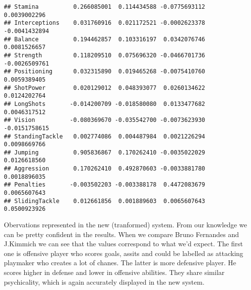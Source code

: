 \documentclass[
]{article}
\newenvironment{Shaded}{\begin{snugshade}}{\end{snugshade}}
\newcommand{\FunctionTok}[1]{\textcolor[rgb]{0.00,0.00,0.00}{#1}}
\newcommand{\NormalTok}[1]{#1}
\newcommand{\OtherTok}[1]{\textcolor[rgb]{0.56,0.35,0.01}{#1}}
\newcommand{\SpecialCharTok}[1]{\textcolor[rgb]{0.00,0.00,0.00}{#1}}
\newcommand{\StringTok}[1]{\textcolor[rgb]{0.31,0.60,0.02}{#1}}
\begin{document}
\begin{verbatim}
## Stamina          0.266085001  0.114434588 -0.0775693112  0.0039002296
## Interceptions    0.031760916  0.021172521 -0.0002623378 -0.0041432894
## Balance          0.194462857  0.103316197  0.0342076746  0.0081526657
## Strength         0.118209510  0.075696320 -0.0466701736 -0.0026509761
## Positioning      0.032315890  0.019465268 -0.0075410760  0.0059389405
## ShotPower        0.020129012  0.048393077  0.0260134622  0.0124202764
## LongShots       -0.014200709 -0.018580080  0.0133477682  0.0046317512
## Vision          -0.080369670 -0.035542700 -0.0073623930 -0.0151758615
## StandingTackle   0.002774086  0.004487984  0.0021226294  0.0098669766
## Jumping          0.905836867  0.170262410 -0.0035022029  0.0126618560
## Aggression       0.170262410  0.492870603 -0.0033881780  0.0018896035
## Penalties       -0.003502203 -0.003388178  0.4472083679  0.0065607643
## SlidingTackle    0.012661856  0.001889603  0.0065607643  0.0500923926
\end{verbatim}

Obervations represented in the new (tranformed) system. From our
knowledge we can be pretty confident in the results. When we compare
Bruno Fernandes and J.Kimmich we can see that the values correspond to
what we'd expect. The first one is offensive player who scores goals,
assits and could be labelled as attacking playmaker who creates a lot of
chanes. The latter is more defensive player. He scores higher in defense
and lower in offensive abilities. They share similar psychicality, which
is again accurately displayed in the new system.

\begin{Shaded}
\end{Shaded}
\end{document}
